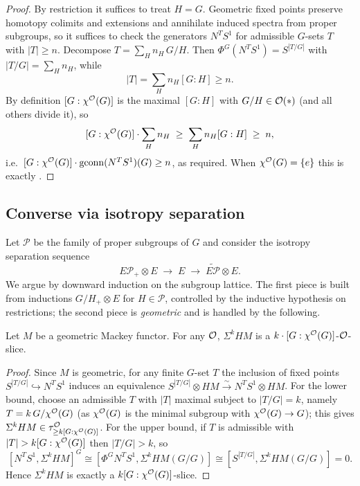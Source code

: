 \documentclass[11pt]{article}
\begin{document}
\begin{proof}
By restriction it suffices to treat $H=G$. Geometric fixed points preserve
homotopy colimits and extensions and annihilate induced spectra from proper
subgroups, so it suffices to check the generators $N^T S^1$ for admissible
$G$-sets $T$ with $|T|\ge n$. Decompose $T=\sum_H n_H\, G/H$. Then
$\Phi^G(N^T S^1)=S^{|T/G|}$ with $|T/G|=\sum_H n_H$, while
\[
|T|=\sum_H n_H[G:H]\ge n .
\]
By definition $[G:\chi^{\mathcal{O}}(G)]$ is the maximal $[G:H]$ with $G/H\in\mathcal{O}(\ast)$
(and all others divide it), so
\[
[G:\chi^{\mathcal{O}}(G)]\cdot\sum_H n_H \;\ge\; \sum_H n_H[G:H]\;\ge\; n,
\]
i.e.\ $[G:\chi^{\mathcal{O}}(G)]\cdot\operatorname{gconn}(N^T S^1)(G)\ge n$, as required. When
$\chi^{\mathcal{O}}(G)=\{e\}$ this is exactly \cite[Thm.~2.5]{HY18}.
\end{proof}

\subsection*{Converse via isotropy separation}

Let $\mathcal P$ be the family of proper subgroups of $G$ and consider the
isotropy separation sequence
\[
E\mathcal P_+\otimes E\;\longrightarrow\; E\;\longrightarrow\;
\widetilde{E\mathcal P}\otimes E .
\]
We argue by downward induction on the subgroup lattice. The first piece is built
from inductions $G/H_+\otimes E$ for $H\in\mathcal P$, controlled by the
inductive hypothesis on restrictions; the second piece is \emph{geometric} and
is handled by the following.

\begin{qfivelemma}\label{lem:geom}
Let $M$ be a geometric Mackey functor. For any $\mathcal{O}$,
$\Sigma^k HM$ is a $k\cdot[G:\chi^{\mathcal{O}}(G)]$-$\mathcal{O}$-slice.
\end{qfivelemma}

\begin{proof}
Since $M$ is geometric, for any finite $G$-set $T$ the inclusion of fixed points
$S^{|T/G|}\hookrightarrow N^T S^1$ induces an equivalence
$S^{|T/G|}\otimes HM\xrightarrow{\sim} N^T S^1\otimes HM$. For the lower bound,
choose an admissible $T$ with $|T|$ maximal subject to $|T/G|=k$, namely
$T=k\,G/\chi^{\mathcal{O}}(G)$ (as $\chi^{\mathcal{O}}(G)$ is the minimal subgroup with
$\chi^{\mathcal{O}}(G)\to G$); this gives $\Sigma^k HM\in\tau^{\mathcal{O}}_{\ge k[G:\chi^{\mathcal{O}}(G)]}$.
For the upper bound, if $T$ is admissible with $|T|>k[G:\chi^\qfiveaO(G)]$ then
$|T/G|>k$, so
\[
[N^T S^1,\Sigma^k HM]^G\cong[\Phi^G N^T S^1,\Sigma^k HM(G/G)]
\cong[S^{|T/G|},\Sigma^k HM(G/G)]=0 .
\]
Hence $\Sigma^k HM$ is exactly a $k[G:\chi^{\mathcal{O}}(G)]$-slice.
\end{proof}
\end{document}

